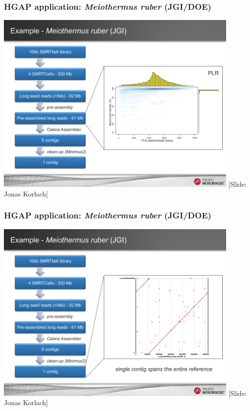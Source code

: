 \documentclass[serif,11pt]{beamer}
\begin{document}
\begin{frame}
\frametitle{HGAP application: \emph{Meiothermus ruber} (JGI/DOE)}
\label{sec-5-3}

   \hspace*{-0.2in}
   \includegraphics[width=4.75in]{img/hgap-mruber2.pdf}
   \hspace*{0.4in}
\newline \tiny [Slide: Jonas Korlach]
\end{frame}
\begin{frame}
\frametitle{HGAP application: \emph{Meiothermus ruber} (JGI/DOE)}
\label{sec-5-4}

   \hspace*{-0.2in}
   \includegraphics[width=4.75in]{img/hgap-mruber3.pdf}
   \newline \tiny [Slide: Jonas Korlach]
\end{frame}
\end{document}
